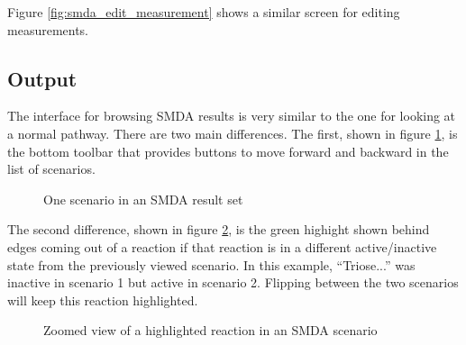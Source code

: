 Figure \ref{fig:smda_edit_measurement} shows a similar screen for editing
measurements.

\subsection{Output}
\label{sect:smda_interface_output}

The interface for browsing SMDA results is very similar to the one for looking
at a normal pathway. There are two main differences. The first, shown in figure
\ref{fig:smda_results}, is the bottom toolbar that provides buttons to move
forward and backward in the list of scenarios.

\begin{figure}[htb]
    \caption{\label{fig:smda_results} One scenario in an SMDA result set}
\end{figure}

The second difference, shown in figure \ref{fig:smda_results_highlight}, is the
green highight shown behind edges coming out of a reaction if that reaction is
in a different active/inactive state from the previously viewed scenario. In
this example, ``Triose...'' was inactive in scenario 1 but active in scenario 2.
Flipping between the two scenarios will keep this reaction highlighted.

\begin{figure}[htb]
    \caption{\label{fig:smda_results_highlight} Zoomed view of a highlighted
    reaction in an SMDA scenario}
\end{figure}
